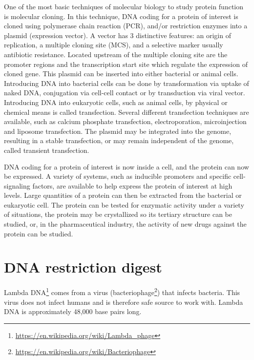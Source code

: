 \documentclass[]{book}
\let\rmarkdownfootnote\footnote%
\def\footnote{\protect\rmarkdownfootnote}
\renewcommand{\href}[2]{#2\footnote{\url{#1}}}
\begin{document}
One of the most basic techniques of molecular biology to study protein function is molecular cloning. In this technique, DNA coding for a protein of interest is cloned using polymerase chain reaction (PCR), and/or restriction enzymes into a plasmid (expression vector). A vector has 3 distinctive features: an origin of replication, a multiple cloning site (MCS), and a selective marker usually antibiotic resistance. Located upstream of the multiple cloning site are the promoter regions and the transcription start site which regulate the expression of cloned gene. This plasmid can be inserted into either bacterial or animal cells. Introducing DNA into bacterial cells can be done by transformation via uptake of naked DNA, conjugation via cell-cell contact or by transduction via viral vector. Introducing DNA into eukaryotic cells, such as animal cells, by physical or chemical means is called transfection. Several different transfection techniques are available, such as calcium phosphate transfection, electroporation, microinjection and liposome transfection. The plasmid may be integrated into the genome, resulting in a stable transfection, or may remain independent of the genome, called transient transfection.

DNA coding for a protein of interest is now inside a cell, and the protein can now be expressed. A variety of systems, such as inducible promoters and specific cell-signaling factors, are available to help express the protein of interest at high levels. Large quantities of a protein can then be extracted from the bacterial or eukaryotic cell. The protein can be tested for enzymatic activity under a variety of situations, the protein may be crystallized so its tertiary structure can be studied, or, in the pharmaceutical industry, the activity of new drugs against the protein can be studied.

\hypertarget{dna-restriction-digest}{%
\section{DNA restriction digest}\label{dna-restriction-digest}}

\href{https://en.wikipedia.org/wiki/Lambda_phage}{Lambda DNA} comes from a virus (\href{https://en.wikipedia.org/wiki/Bacteriophage}{bacteriophage}) that infects bacteria. This virus does not infect humans and is therefore safe source to work with. Lambda DNA is approximately 48,000 base pairs long.
\end{document}
